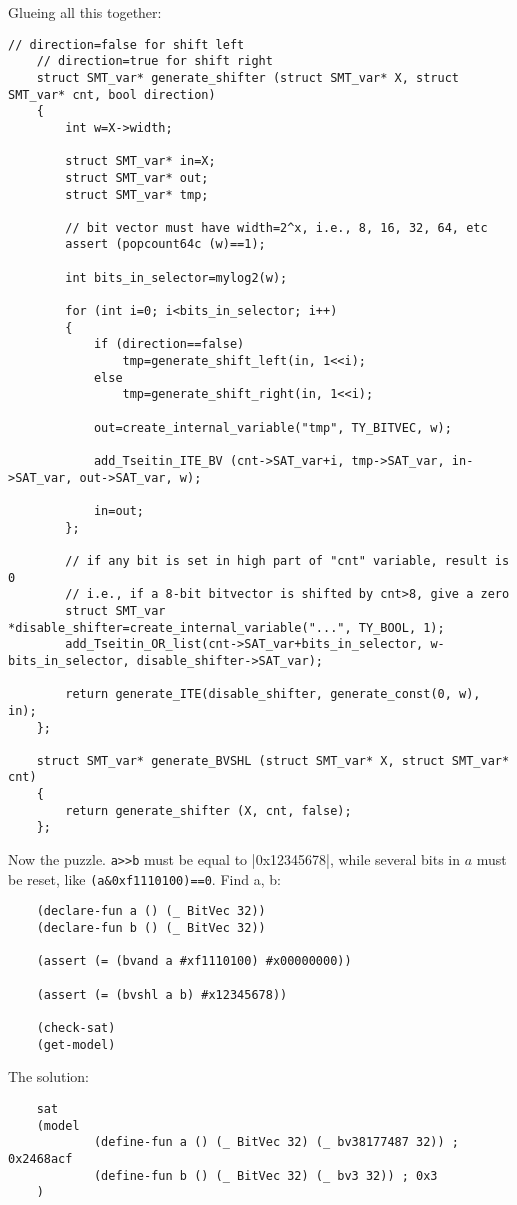 Glueing all this together:

\begin{lstlisting}[style=customc]
	// direction=false for shift left
	// direction=true for shift right
	struct SMT_var* generate_shifter (struct SMT_var* X, struct SMT_var* cnt, bool direction)
	{
		int w=X->width;

		struct SMT_var* in=X;
		struct SMT_var* out;
		struct SMT_var* tmp;

		// bit vector must have width=2^x, i.e., 8, 16, 32, 64, etc
		assert (popcount64c (w)==1);

		int bits_in_selector=mylog2(w);

		for (int i=0; i<bits_in_selector; i++)
		{
			if (direction==false)
				tmp=generate_shift_left(in, 1<<i);
			else
				tmp=generate_shift_right(in, 1<<i);

			out=create_internal_variable("tmp", TY_BITVEC, w);

			add_Tseitin_ITE_BV (cnt->SAT_var+i, tmp->SAT_var, in->SAT_var, out->SAT_var, w);

			in=out;
		};

		// if any bit is set in high part of "cnt" variable, result is 0
		// i.e., if a 8-bit bitvector is shifted by cnt>8, give a zero
		struct SMT_var *disable_shifter=create_internal_variable("...", TY_BOOL, 1);
		add_Tseitin_OR_list(cnt->SAT_var+bits_in_selector, w-bits_in_selector, disable_shifter->SAT_var);

		return generate_ITE(disable_shifter, generate_const(0, w), in);
	};

	struct SMT_var* generate_BVSHL (struct SMT_var* X, struct SMT_var* cnt)
	{
		return generate_shifter (X, cnt, false);
	};
\end{lstlisting}

Now the puzzle.
\verb|a>>b| must be equal to |0x12345678|, while several bits in $a$ must be reset, like \verb|(a&0xf1110100)==0|.  Find a, b:

\begin{lstlisting}
	(declare-fun a () (_ BitVec 32))
	(declare-fun b () (_ BitVec 32))

	(assert (= (bvand a #xf1110100) #x00000000))

	(assert (= (bvshl a b) #x12345678))

	(check-sat)
	(get-model)
\end{lstlisting}

The solution:

\begin{lstlisting}
	sat
	(model
	        (define-fun a () (_ BitVec 32) (_ bv38177487 32)) ; 0x2468acf
        	(define-fun b () (_ BitVec 32) (_ bv3 32)) ; 0x3
	)
\end{lstlisting}

